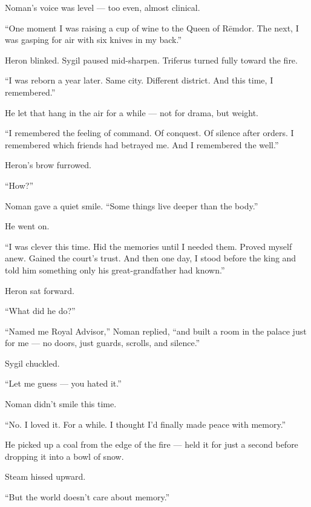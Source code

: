 \documentclass[9pt]{article}
\begin{document}
Noman’s voice was level — too even, almost clinical.

“One moment I was raising a cup of wine to the Queen of Rēmdor. The next, I was gasping for air with six knives in my back.”

\vspace{1em}

Heron blinked. Sygil paused mid-sharpen. Triferus turned fully toward the fire.

“I was reborn a year later. Same city. Different district. And this time, I remembered.”

\vspace{1em}

He let that hang in the air for a while — not for drama, but weight.

“I remembered the feeling of command. Of conquest. Of silence after orders. I remembered which friends had betrayed me. And I remembered the well.”

Heron’s brow furrowed.

“How?”

Noman gave a quiet smile. “Some things live deeper than the body.”

\vspace{1em}

He went on.

“I was clever this time. Hid the memories until I needed them. Proved myself anew. Gained the court’s trust. And then one day, I stood before the king and told him something only his great-grandfather had known.”

Heron sat forward.

“What did he do?”

“Named me Royal Advisor,” Noman replied, “and built a room in the palace just for me — no doors, just guards, scrolls, and silence.”

Sygil chuckled.

“Let me guess — you hated it.”

Noman didn’t smile this time.

“No. I loved it. For a while. I thought I’d finally made peace with memory.”

He picked up a coal from the edge of the fire — held it for just a second before dropping it into a bowl of snow.

Steam hissed upward.

“But the world doesn’t care about memory.”

\vspace{1em}
\end{document}
